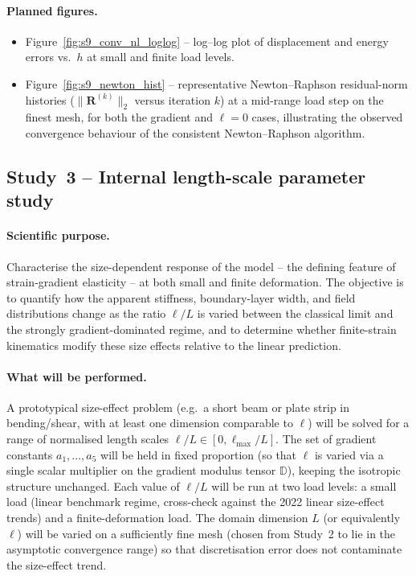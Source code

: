 \documentclass[11pt]{article}
\begin{document}
\paragraph{Planned figures.}
\begin{itemize}
  \item Figure~\ref{fig:s9_conv_nl_loglog} -- log--log plot of
    displacement and energy errors vs.\ $h$ at small and finite
    load levels.
  \item Figure~\ref{fig:s9_newton_hist} -- representative
    Newton--Raphson residual-norm histories ($\|\mathbf{R}^{(k)}\|_2$
    versus iteration $k$) at a mid-range load step on the finest
    mesh, for both the gradient and $\ell=0$ cases, illustrating
    the observed convergence behaviour of the consistent
    Newton--Raphson algorithm.
\end{itemize}

\subsection{Study~3 -- Internal length-scale parameter study}
\label{ssec:s9_study3}

\paragraph{Scientific purpose.}
Characterise the size-dependent response of the model -- the
defining feature of strain-gradient elasticity -- at both small
and finite deformation.  The objective is to quantify how the
apparent stiffness, boundary-layer width, and field distributions
change as the ratio $\ell/L$ is varied between the classical limit
and the strongly gradient-dominated regime, and to determine whether
finite-strain kinematics modify these size effects relative to the
linear prediction.

\paragraph{What will be performed.}
A prototypical size-effect problem (e.g.\ a short beam or plate
strip in bending/shear, with at least one dimension comparable to
$\ell$) will be solved for a range of normalised length scales
$\ell/L\in[0,\ell_{\max}/L]$.  The set of gradient constants
$a_1,\ldots,a_5$ will be held in fixed proportion (so that $\ell$
is varied via a single scalar multiplier on the gradient modulus
tensor $\mathbb{D}$), keeping the isotropic structure unchanged.
Each value of $\ell/L$ will be run at two load levels: a small
load (linear benchmark regime, cross-check against the 2022
linear size-effect trends) and a finite-deformation load.  The
domain dimension $L$ (or equivalently $\ell$) will be varied on
a sufficiently fine mesh (chosen from Study~2 to lie in the
asymptotic convergence range) so that discretisation error does
not contaminate the size-effect trend.
\end{document}
